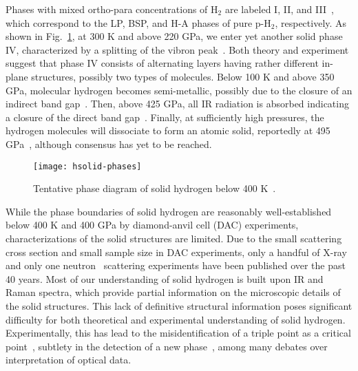 
Phases with mixed ortho-para concentrations of H$_2$ are labeled I, II, and III~\cite{Dias2016,Dias2019}, which correspond to the LP, BSP, and H-A phases of pure p-H$_2$, respectively.
As shown in Fig.~\ref{fig:hsolid-phases}, at 300 K and above 220 GPa, we enter yet another solid phase IV, characterized by a splitting of the vibron peak~\cite{Zha2013}.
Both theory and experiment suggest that phase IV consists of alternating layers having rather different in-plane structures, possibly two types of molecules.
Below 100 K and above 350 GPa, molecular hydrogen becomes semi-metallic, possibly due to the closure of an indirect band gap~\cite{Eremets2019}.
Then, above 425 GPa, all IR radiation is absorbed indicating a closure of the direct band gap~\cite{Loubeyre2020}.
Finally, at sufficiently high pressures, the hydrogen molecules will dissociate to form an atomic solid, reportedly at 495 GPa~\cite{Silvera2017}, although consensus has yet to be reached.

\begin{figure}[h]
\centering
\texttt{[image: hsolid-phases]}
\caption{Tentative phase diagram of solid hydrogen below 400 K~\cite{Dias2019}.}
\label{fig:hsolid-phases}
\end{figure}

While the phase boundaries of solid hydrogen are reasonably well-established below 400 K and 400 GPa by diamond-anvil cell (DAC) experiments, characterizations of the solid structures are limited. Due to the small scattering cross section and small sample size in DAC experiments, only a handful of X-ray~\cite{Hazen1987,MAO1988,Loubeyre1996,Kawamura2002,Goncharenko2005a,Akahama2010,Ji2019} and only one neutron~\cite{Goncharenko2005a} scattering experiments have been published over the past 40 years. Most of our understanding of solid hydrogen is built upon IR and Raman spectra, which provide partial information on the microscopic details of the solid structures. This lack of definitive structural information poses significant difficulty for both theoretical and experimental understanding of solid hydrogen. Experimentally, this has lead to the misidentification of a triple point as a critical point~\cite{Lorenzana1990,Cui1994}, subtlety in the detection of a new phase~\cite{Eremets2009,Howie2012}, among many debates over interpretation of optical data.

